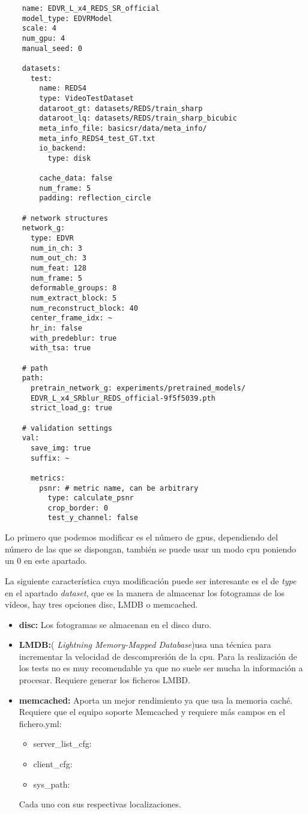 \label{lis:yml}
\begin{lstlisting}
    name: EDVR_L_x4_REDS_SR_official
    model_type: EDVRModel
    scale: 4
    num_gpu: 4  
    manual_seed: 0
    
    datasets:
      test:
        name: REDS4
        type: VideoTestDataset
        dataroot_gt: datasets/REDS/train_sharp
        dataroot_lq: datasets/REDS/train_sharp_bicubic
        meta_info_file: basicsr/data/meta_info/
        meta_info_REDS4_test_GT.txt
        io_backend:
          type: disk
    
        cache_data: false
        num_frame: 5
        padding: reflection_circle
    
    # network structures
    network_g:
      type: EDVR
      num_in_ch: 3
      num_out_ch: 3
      num_feat: 128
      num_frame: 5
      deformable_groups: 8
      num_extract_block: 5
      num_reconstruct_block: 40
      center_frame_idx: ~
      hr_in: false
      with_predeblur: true
      with_tsa: true
    
    # path
    path:
      pretrain_network_g: experiments/pretrained_models/
      EDVR_L_x4_SRblur_REDS_official-9f5f5039.pth
      strict_load_g: true
    
    # validation settings
    val:
      save_img: true
      suffix: ~ 
    
      metrics:
        psnr: # metric name, can be arbitrary
          type: calculate_psnr
          crop_border: 0
          test_y_channel: false
\end{lstlisting}

Lo primero que podemos modificar es el número de gpus, dependiendo del número de las que se dispongan, también se puede usar un modo cpu poniendo un 0 en este apartado. 

La siguiente característica cuya modificación puede ser interesante es el de \emph{type} en el apartado \emph{dataset}, que es la manera de almacenar los fotogramas de los vídeos, hay tres opciones disc, LMDB o memcached. 
\begin{itemize}
	\item \textbf{disc:} Los fotogramas se almacenan en el disco duro.
	\item \textbf{LMDB:}(\emph{ Lightning Memory-Mapped Database})usa una técnica para incrementar la velocidad de descompresión de la cpu. Para la realización de los tests no es muy recomendable ya que no suele ser mucha la información a procesar. Requiere generar los ficheros LMBD\cite{LMBD}.
	\item \textbf{memcached:} Aporta un mejor rendimiento ya que usa la memoria caché. Requiere que el equipo soporte Memcached\cite{Memcached} y requiere más campos en el fichero.yml:
	\begin{itemize}
	\item server\_list\_cfg:
	\item client\_cfg:
	\item sys\_path:
   	 \end{itemize}
   	 Cada uno con sus respectivas localizaciones.
\end{itemize}

